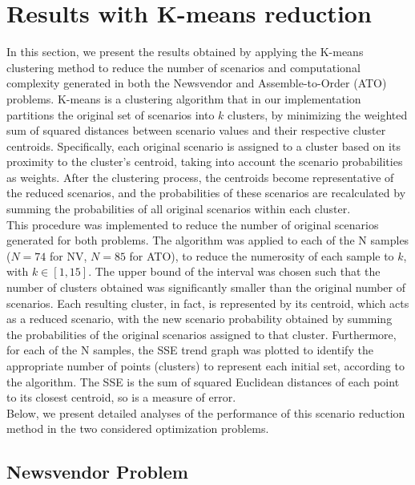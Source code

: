 \documentclass[a4paper,12pt]{article}
\begin{document}
	
	\newpage
	\section{Results with K-means reduction}
	
	In this section, we present the results obtained by applying the K-means clustering method to reduce the number of scenarios and computational complexity generated in both the Newsvendor and Assemble-to-Order (ATO) problems. K-means is a clustering algorithm that in our implementation partitions the original set of scenarios into \(k\) clusters, by minimizing the weighted sum of squared distances between scenario values and their respective cluster centroids. Specifically, each original scenario is assigned to a cluster based on its proximity to the cluster's centroid, taking into account the scenario probabilities as weights. 
	After the clustering process, the centroids become representative of the reduced scenarios, and the probabilities of these scenarios are recalculated by summing the probabilities of all original scenarios within each cluster.\\
	
	\noindent This procedure was implemented to reduce the number of original scenarios generated for both problems. The algorithm was applied to each of the N samples ($N = 74$ for NV, $N = 85$ for ATO), to reduce the numerosity of each sample to $k$, with $k \in [1,15]$. The upper bound of the interval was chosen such that the number of clusters obtained was significantly smaller than the original number of scenarios. Each resulting cluster, in fact, is represented by its centroid, which acts as a reduced scenario, with the new scenario probability obtained by summing the probabilities of the original scenarios assigned to that cluster. Furthermore, for each of the N samples, the SSE trend graph was plotted to identify the appropriate number of points (clusters) to represent each initial set, according to the algorithm. The SSE is the sum of squared Euclidean distances of each point to its closest centroid, so is a measure of error.\\
	
	\noindent Below, we present detailed analyses of the performance of this scenario reduction method in the two considered optimization problems.
	\newpage
	\subsection{Newsvendor Problem}
	
\end{document}
